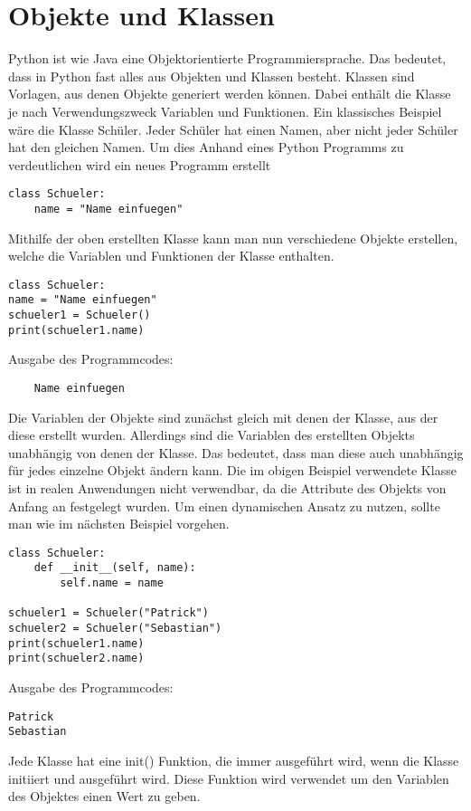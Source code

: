 \chapter{Objekte und Klassen}

\label{objundklassen}
Python ist wie Java eine Objektorientierte Programmiersprache. 
Das bedeutet, dass in Python fast alles aus Objekten und Klassen besteht.
Klassen sind Vorlagen, aus denen Objekte generiert werden k{\"o}nnen.
Dabei enth{\"a}lt die Klasse je nach Verwendungszweck Variablen und Funktionen.
Ein klassisches Beispiel w{\"a}re die Klasse \glqq Sch{\"u}ler\grqq{}. Jeder Sch{\"u}ler hat einen Namen, aber nicht jeder Sch{\"u}ler hat den gleichen Namen.
Um dies  Anhand eines Python Programms zu verdeutlichen wird ein neues Programm erstellt
\begin{lstlisting}
class Schueler:
	name = "Name einfuegen"
\end{lstlisting}
Mithilfe der oben erstellten Klasse kann man nun verschiedene Objekte erstellen, welche die Variablen und Funktionen der Klasse enthalten.
\begin{lstlisting}
class Schueler:
name = "Name einfuegen"
schueler1 = Schueler()
print(schueler1.name)
\end{lstlisting}
Ausgabe des Programmcodes:
\begin{lstlisting}
	Name einfuegen
\end{lstlisting}
Die Variablen der Objekte sind zun{\"a}chst gleich mit denen der Klasse, aus der diese erstellt wurden.
Allerdings sind die Variablen des erstellten Objekts unabh{\"a}ngig von denen der Klasse. Das bedeutet, dass  man diese auch unabh{\"a}ngig f{\"u}r jedes einzelne Objekt {\"a}ndern kann. Die im obigen Beispiel verwendete Klasse ist in realen Anwendungen  nicht verwendbar, da die Attribute des Objekts von Anfang an festgelegt wurden. Um einen dynamischen Ansatz zu nutzen, sollte man wie im n{\"a}chsten Beispiel vorgehen.
\begin{lstlisting}
class Schueler:
	def __init__(self, name):
		self.name = name

schueler1 = Schueler("Patrick")
schueler2 = Schueler("Sebastian")
print(schueler1.name)
print(schueler2.name)
\end{lstlisting}
Ausgabe des Programmcodes:
\begin{lstlisting}
Patrick
Sebastian
\end{lstlisting}
Jede Klasse hat eine init() Funktion, die immer ausgef{\"u}hrt wird, wenn die Klasse initiiert und ausgef{\"u}hrt wird. Diese Funktion wird verwendet um den Variablen des Objektes einen Wert zu geben.
